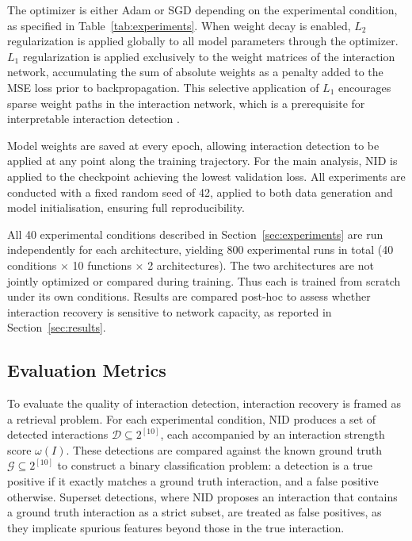 \documentclass{article}
\begin{document}
The optimizer is either Adam or SGD depending on the experimental condition, 
as specified in Table~\ref{tab:experiments}. When weight decay is enabled, 
$L_2$ regularization is applied globally to all model parameters through the 
optimizer. $L_1$ regularization is applied exclusively to the weight matrices 
of the interaction network, accumulating the sum of absolute weights as a 
penalty added to the MSE loss prior to backpropagation. This selective 
application of $L_1$ encourages sparse weight paths in the interaction 
network, which is a prerequisite for interpretable interaction detection 
\citep{tsang2017detecting}.

Model weights are saved at every epoch, allowing interaction detection to be 
applied at any point along the training trajectory. For the main analysis, 
NID is applied to the checkpoint achieving the lowest validation loss. All 
experiments are conducted with a fixed random seed of 42, applied to both 
data generation and model initialisation, ensuring full reproducibility.

All 40 experimental conditions described in Section~\ref{sec:experiments} are run independently for each architecture, yielding 800 experimental runs in total (40 conditions $\times$ 10 functions $\times$
 2 architectures). The two architectures are not jointly optimized or compared during training. Thus each is trained from scratch under its own conditions. Results are compared post-hoc to assess whether interaction recovery is sensitive to network capacity, as reported in Section~\ref{sec:results}.

\subsection{Evaluation Metrics}
\label{sec:eval_metric}
To evaluate the quality of interaction detection, interaction recovery is 
framed as a retrieval problem. For each experimental condition, NID produces 
a set of detected interactions $\mathcal{D} \subseteq 2^{[10]}$, each 
accompanied by an interaction strength score $\omega(I)$. These detections 
are compared against the known ground truth $\mathcal{G} \subseteq 2^{[10]}$ 
to construct a binary classification problem: a detection is a true positive 
if it exactly matches a ground truth interaction, and a false positive 
otherwise. Superset detections, where NID proposes an interaction that 
contains a ground truth interaction as a strict subset, are treated as false 
positives, as they implicate spurious features beyond those in the true 
interaction.
\end{document}
